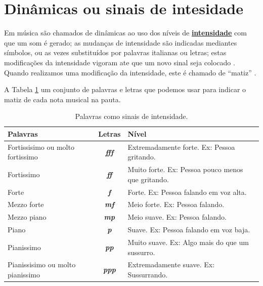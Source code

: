 \section{Dinâmicas ou sinais de intesidade}
\label{sec:sinaisintensidade}

Em música são chamados de dinâmicas ao uso dos níveis de 
\hyperref[sec:pos:Intensidade]{\textbf{intensidade}} com que um som é gerado;
as mudanças de intensidade são indicadas mediantes símbolos, 
ou as vezes substituídos por palavras italianas ou letras;
estas modificações da intensidade vigoram ate que um novo sinal seja colocado \cite[pp. 213]{medteoria} \cite[pp. 117]{mascarenhascurso}.
Quando realizamos uma modificação da intensidade, este é chamado de ``matiz''  \cite[pp. 213]{medteoria}.

A Tabela \ref{tab:palavras:intensidade} um conjunto de palavras e letras que podemos usar 
para indicar o matiz de cada nota musical na pauta. 
\begin{table}[h]
\centering
\begin{tabular}{|p{4cm}|c|p{7cm}|}
\hline
Palavras  & Letras & Nível \\ \hline
\hline 
Fortissisimo ou molto fortissimo  & \textbf{\textit{fff}}   & Extremadamente forte. Ex: Pessoa gritando. \\ \hline
Fortissimo    & \textbf{\textit{ff}}    & Muito forte. Ex: Pessoa pouco menos que gritando. \\  \hline
Forte         & \textbf{\textit{f}}     & Forte. Ex: Pessoa falando em voz alta. \\  \hline
Mezzo forte   & \textbf{\textit{mf}}    & Meio forte. Ex: Pessoa falando.\\  \hline
Mezzo piano   & \textbf{\textit{mp}}    & Meio suave. Ex: Pessoa falando. \\  \hline
Piano         & \textbf{\textit{p}}     & Suave. Ex: Pessoa falando em voz baja. \\  \hline
Pianissimo    & \textbf{\textit{pp}}    & Muito suave. Ex: Algo mais do que um sussurro. \\  \hline
Pianissisimo ou molto pianissimo  & \textbf{\textit{ppp}}   & Extremadamente suave. Ex: Sussurrando. \\  \hline
\end{tabular}
\caption{Palavras como sinais de intensidade.}
\label{tab:palavras:intensidade}
\end{table}

